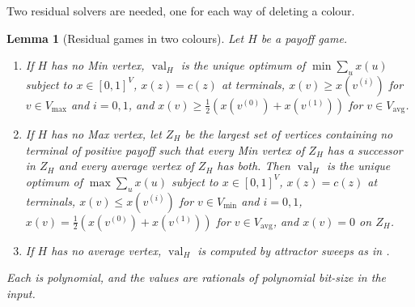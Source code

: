 \documentclass[11pt]{article}
\theoremstyle{plain}
\newtheorem{lemma}[theorem]{Lemma}
\theoremstyle{definition}
\DeclareMathOperator{\val}{val}
\newcommand{\Vmax}{V_{\max}}
\newcommand{\Vmin}{V_{\min}}
\newcommand{\Vavg}{V_{\mathrm{avg}}}
\begin{document}
Two residual solvers are needed, one for each way of deleting a colour.

\begin{lemma}[Residual games in two colours]\label{lem:residual}
Let $H$ be a payoff game.
\begin{enumerate}[label=(\alph*),leftmargin=2.2em]
\item If $H$ has no Min vertex, $\val_H$ is the unique optimum of
      $\min\sum_u x(u)$ subject to $x\in[0,1]^{V}$, $x(z)=c(z)$ at
      terminals, $x(v)\ge x(v^{(i)})$ for $v\in\Vmax$ and $i=0,1$, and
      $x(v)\ge\tfrac12(x(v^{(0)})+x(v^{(1)}))$ for $v\in\Vavg$.
\item If $H$ has no Max vertex, let $Z_H$ be the largest set of vertices
      containing no terminal of positive payoff such that every Min vertex
      of $Z_H$ has a successor in $Z_H$ and every average vertex of $Z_H$
      has both. Then $\val_H$ is the unique optimum of
      $\max\sum_u x(u)$ subject to $x\in[0,1]^{V}$, $x(z)=c(z)$ at
      terminals, $x(v)\le x(v^{(i)})$ for $v\in\Vmin$ and $i=0,1$,
      $x(v)=\tfrac12(x(v^{(0)})+x(v^{(1)}))$ for $v\in\Vavg$, and
      $x(v)=0$ on $Z_H$.
\item If $H$ has no average vertex, $\val_H$ is computed by attractor
      sweeps as in .
\end{enumerate}
Each is polynomial, and the values are rationals of polynomial bit-size in
the input.
\end{lemma}
\end{document}
